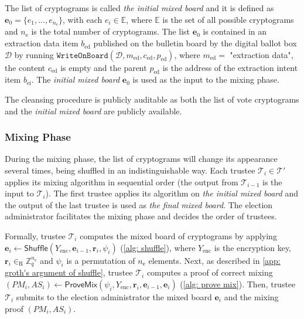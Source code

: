 The list of cryptograms is called \textit{the initial mixed board} and it is defined as $\boldsymbol{e}_0 = \{ e_1, ..., e_{n_\mathrm{e}} \}$, with each $e_i \in \mathbb{E}$, where $\mathbb{E}$ is the set of all possible cryptograms and $n_\mathrm{e}$ is the total number of cryptograms. The list $\boldsymbol{e}_0$ is contained in an extraction data item $b_\mathrm{ed}$ published on the bulletin board by the digital ballot box $\mathcal{D}$ by running $\mathtt{WriteOnBoard}(\mathcal{D}, m_\mathrm{ed}, c_\mathrm{ed}, p_\mathrm{ed})$, where $m_\mathrm{ed} = $ "extraction data", the content $c_\mathrm{ed}$ is empty and the parent $p_\mathrm{ed}$ is the address of the extraction intent item $b_\mathrm{ei}$. The \textit{initial mixed board} $\boldsymbol{e}_0$ is used as the input to the mixing phase.

The cleansing procedure is publicly auditable as both the list of vote cryptograms and the \textit{initial mixed board} are publicly available.


\subsubsection{Mixing Phase} \label{sec: mixing phase}
During the mixing phase, the list of cryptograms will change its appearance several times, being shuffled in an indistinguishable way. Each trustee \( \mathcal{T}_i \in \boldsymbol{\mathcal{T}'} \) applies its mixing algorithm in sequential order (the output from $\mathcal{T}_{i-1}$ is the input to $\mathcal{T}_i$). The first trustee applies its algorithm on \textit{the initial mixed board} and the output of the last trustee is used as \textit{the final mixed board}. The election administrator facilitates the mixing phase and decides the order of trustees.

Formally, trustee $\mathcal{T}_i$ computes the mixed board of cryptograms by applying $\boldsymbol{e}_i \gets \mathsf{Shuffle}(Y_\mathrm{enc}, \boldsymbol{e}_{i-1}, \boldsymbol{r}_i, \psi_i)$ (\cref{alg: shuffle}), where $Y_\mathrm{enc}$ is the encryption key, $\boldsymbol{r}_i \in_\mathrm{R} \mathbb{Z}_q^{n_\mathrm{e}}$ and $\psi_i$ is a permutation of $n_\mathrm{e}$ elements. Next, as described in \cref{app: groth's argument of shuffle}, trustee $\mathcal{T}_i$ computes a proof of correct mixing $(PM_i, AS_i) \gets \mathsf{ProveMix}(\psi_i, Y_\mathrm{enc}, \boldsymbol{r}_i, \boldsymbol{e}_{i-1}, \boldsymbol{e}_i)$ (\cref{alg: prove mix}). Then, trustee $\mathcal{T}_i$ submits to the election administrator the mixed board $\boldsymbol{e}_i$ and the mixing proof $(PM_i, AS_i)$.

